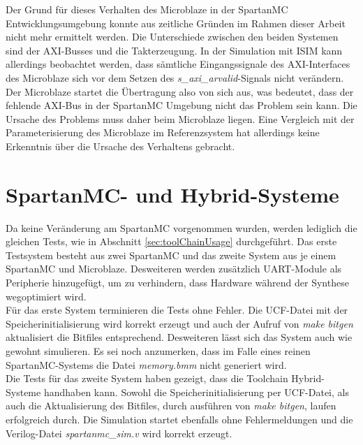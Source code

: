 Der Grund für dieses Verhalten des Microblaze in der SpartanMC Entwicklungsumgebung konnte aus zeitliche Gründen im Rahmen dieser Arbeit nicht mehr ermittelt werden. Die Unterschiede zwischen den beiden Systemen sind der AXI-Busses und die Takterzeugung. In der Simulation mit ISIM kann allerdings beobachtet werden, dass sämtliche Eingangssignale des AXI-Interfaces des Microblaze sich vor dem Setzen des \textit{s\_axi\_arvalid}-Signals nicht verändern. Der Microblaze startet die Übertragung also von sich aus, was bedeutet, dass der fehlende AXI-Bus in der SpartanMC Umgebung nicht das Problem sein kann. Die Ursache des Problems muss daher beim Microblaze liegen. Eine Vergleich mit der Parameterisierung des Microblaze im Referenzsystem hat allerdings keine Erkenntnis über die Ursache des Verhaltens gebracht.
\section{SpartanMC- und Hybrid-Systeme}
Da keine Veränderung am SpartanMC vorgenommen wurden, werden lediglich die gleichen Tests, wie in Abschnitt \ref{sec:toolChainUsage} durchgeführt. Das erste Testsystem besteht aus zwei SpartanMC und das zweite System aus je einem SpartanMC und Microblaze. Desweiteren werden zusätzlich UART-Module als Peripherie hinzugefügt, um zu verhindern, dass Hardware während der Synthese wegoptimiert wird.\\
Für das erste System terminieren die Tests ohne Fehler. Die UCF-Datei mit der Speicherinitialisierung wird korrekt erzeugt und auch der Aufruf von \textit{make bitgen} aktualisiert die Bitfiles entsprechend. Desweiteren lässt sich das System auch wie gewohnt simulieren. Es sei noch anzumerken, dass im Falle eines reinen SpartanMC-Systems die Datei \textit{memory.bmm} nicht generiert wird.\\
Die Tests für das zweite System haben gezeigt, dass die Toolchain Hybrid-Systeme handhaben kann. Sowohl die Speicherinitialisierung per UCF-Datei, als auch die Aktualisierung des Bitfiles, durch ausführen von \textit{make bitgen}, laufen erfolgreich durch. Die Simulation startet ebenfalls ohne Fehlermeldungen und die Verilog-Datei \textit{spartanmc\_sim.v} wird korrekt erzeugt. 
